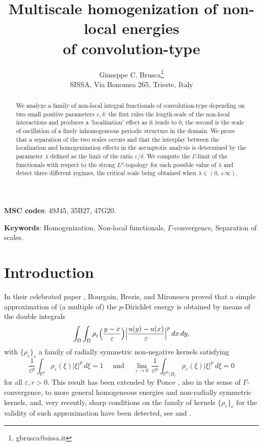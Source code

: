 \documentclass{article}
\theoremstyle{definition}
\newcommand{\e}{\varepsilon}
\newcommand{\R}{\mathbb{R}}
\begin{document}
 
\title{Multiscale homogenization of non-local energies \\ of convolution-type}
\author{ Giuseppe C. Brusca\footnote{gbrusca@sissa.it}  \\ 
SISSA,  Via Bonomea 265, Trieste, Italy}
\date{}			

\maketitle

\begin{abstract} We analyze a family of non-local integral functionals of convolution-type depending on two small positive parameters $\e,\delta$: the first rules the length-scale of the non-local interactions and produces a `localization' effect as it tends to $0$, the second is the scale of oscillation of a finely inhomogeneous periodic structure in the domain. We prove that a separation of the two scales occurs and that the interplay between the localization and homogenization effects in the asymptotic analysis is determined by the parameter $\lambda$ defined as the limit of the ratio $\e/\delta$. We compute the $\Gamma$-limit of the functionals with respect to the strong $L^p$-topology for each possible value of $\lambda$ and detect  three different regimes, the critical scale being obtained when $\lambda\in(0,+\infty)$.
\end{abstract} 

{\small {\bf MSC codes}: 49J45, 35B27, 47G20.}

{\small {\bf Keywords}: Homogenization, Non-local functionals, $\Gamma$-convergence, Separation of scales.}

\section{Introduction}

In their celebrated paper \cite{BBM}, Bourgain, Brezis, and Mironescu proved that a simple approximation of (a multiple of) the $p$-Dirichlet energy is obtained by means of the double integrals 
\begin{equation}\label{functionalsBBM}
    \int_\Omega\int_\Omega \rho_\varepsilon\Bigl(\frac{y-x}{\e}\Bigr)\Bigl|\frac{u(y)-u(x)}{\e}\Bigr|^p\, dx\,dy,
\end{equation}
with $\{\rho_\varepsilon\}_\varepsilon$ a family of radially symmetric non-negative kernels satisfying
\begin{equation*}
\frac{1}{\e^p}\int_{\R^d}\rho_\e(\xi)|\xi|^p\,d\xi=1 \quad \text{ and } \quad   \lim_{\e\to0}\,\frac{1}{\e^p}\int_{\R^d\setminus B_r} \rho_\e(\xi)|\xi|^p\,d\xi = 0
\end{equation*}
for all $\e,r>0$. This result has been extended by Ponce \cite{P1}, also in the sense of $\Gamma$-convergence, to more general homogeneous energies and non-radially symmetric kernels, and, very recently, sharp conditions on the family of kernels $\{\rho_\e\}_\e$ for the validity of such approximation have been detected, see \cite{DDP} and \cite{GS}.
\end{document}
